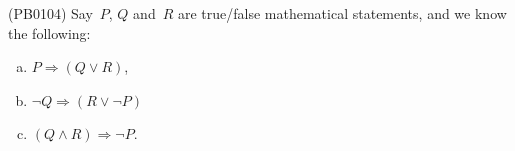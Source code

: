 (PB0104) Say~$P$, $Q$ and~$R$ are true/false mathematical statements, and we know the following:
\begin{enumerate}[(a)]
\item $P\Rightarrow(Q\vee R)$,
\item $\neg Q\Rightarrow (R\vee\neg P)$
\item $(Q\wedge R)\Rightarrow \neg P$.
\end{enumerate}
